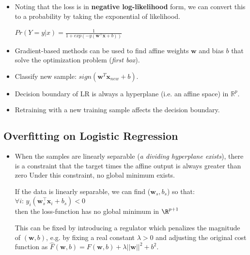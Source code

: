 \documentclass[english]{latex4ei/latex4ei_sheet}
\begin{document}
\begin{sectionbox}
\begin{itemize}
\begin{center}
\end{center}
\item Noting that the loss is in \textbf{negative log-likelihood} form, we can convert this to a probability by taking the exponential of likelihood.
\begin{emphbox}
    \begin{center}
        $Pr(Y=y|x)=\frac{1}{1+exp(-y(\mathbf{w}^{\top}\mathbf{x}+b))}$
    \end{center}
\end{emphbox}
\item Gradient-based methods can be used to find affine weights $\mathbf{w}$ and bias $b$ that solve the optimization problem (\emph{first box}).
\item Classify new sample: $sign(\mathbf{w}^{T}\mathbf{x}_{new}+b)$.
\item Decision boundary of LR is always a hyperplane (i.e. an affine space) in $\mathbb{R}^p$.
\item Retraining with a new training sample affects the decision boundary.
\end{itemize}

\subsection{Overfitting on Logistic Regression}
\begin{itemize}
\item When the samples are linearly separable (\emph{a dividing hyperplane exists}), there is a constraint that the target times the affine output is always greater than zero Under this constraint, no global minimum exists.
\begin{emphbox}
    If the data is linearly separable, we can find ($\mathbf{w}_s,b_s$) so that: $\forall i:\,y_i(\mathbf{w}_s^{\top}\mathbf{x}_i+b_s)<0$ \\
    then the loss-function has no global minimum in $\R^{p+1}$
\end{emphbox}
This can be fixed by introducing a regulator which penalizes the magnitude of $(\mathbf{w}, b)$, e.g. by fixing a real constant $\lambda>0$ and adjusting the original cost function as  $\hat{F}(\mathbf{w}, b)=F(\mathbf{w}, b)+\lambda||\mathbf{w}||^2+b^2$.
\end{itemize}


\end{sectionbox}
\end{document}
